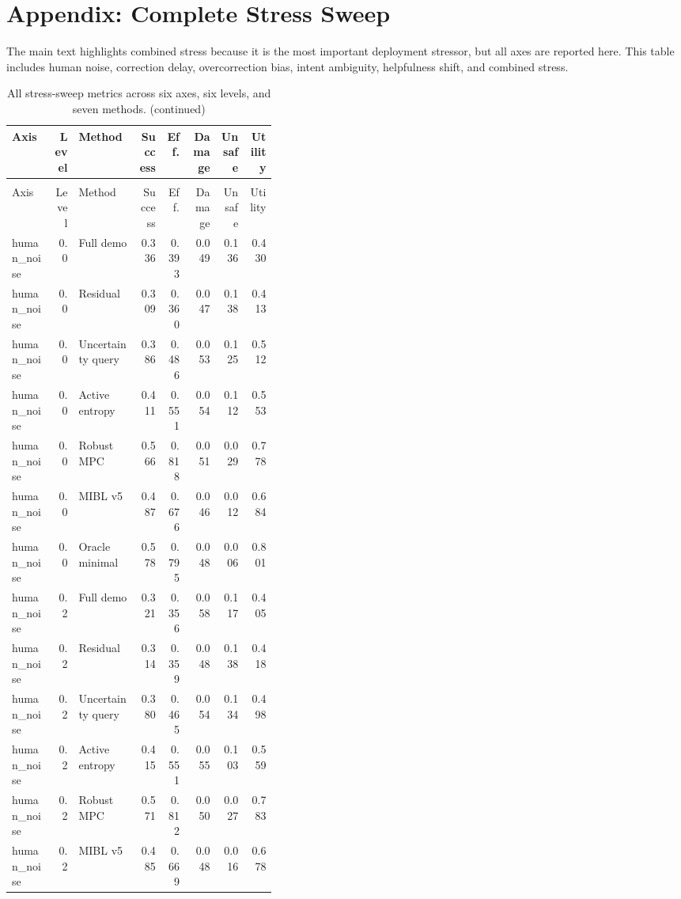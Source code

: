 \documentclass{article}
\begin{document}
\section{Appendix: Complete Stress Sweep}
The main text highlights combined stress because it is the most important deployment stressor, but all axes are reported here. This table includes human noise, correction delay, overcorrection bias, intent ambiguity, helpfulness shift, and combined stress.
\begin{center}
\tiny
\begin{longtable}{p{0.16\linewidth}rp{0.23\linewidth}rrrrr}
\caption{All stress-sweep metrics across six axes, six levels, and seven methods.}\label{tab:full-stress}\\
\toprule
Axis & Level & Method & Success & Eff. & Damage & Unsafe & Utility\\
\midrule
\endfirsthead
\caption[]{All stress-sweep metrics across six axes, six levels, and seven methods. (continued)}\\
\toprule
Axis & Level & Method & Success & Eff. & Damage & Unsafe & Utility\\
\midrule
\endhead
human\_noise & 0.0 & Full demo & 0.336 & 0.393 & 0.049 & 0.136 & 0.430\\
human\_noise & 0.0 & Residual & 0.309 & 0.360 & 0.047 & 0.138 & 0.413\\
human\_noise & 0.0 & Uncertainty query & 0.386 & 0.486 & 0.053 & 0.125 & 0.512\\
human\_noise & 0.0 & Active entropy & 0.411 & 0.551 & 0.054 & 0.112 & 0.553\\
human\_noise & 0.0 & Robust MPC & 0.566 & 0.818 & 0.051 & 0.029 & 0.778\\
human\_noise & 0.0 & MIBL v5 & 0.487 & 0.676 & 0.046 & 0.012 & 0.684\\
human\_noise & 0.0 & Oracle minimal & 0.578 & 0.795 & 0.048 & 0.006 & 0.801\\
human\_noise & 0.2 & Full demo & 0.321 & 0.356 & 0.058 & 0.117 & 0.405\\
human\_noise & 0.2 & Residual & 0.314 & 0.359 & 0.048 & 0.138 & 0.418\\
human\_noise & 0.2 & Uncertainty query & 0.380 & 0.465 & 0.054 & 0.134 & 0.498\\
human\_noise & 0.2 & Active entropy & 0.415 & 0.551 & 0.055 & 0.103 & 0.559\\
human\_noise & 0.2 & Robust MPC & 0.571 & 0.812 & 0.050 & 0.027 & 0.783\\
human\_noise & 0.2 & MIBL v5 & 0.485 & 0.669 & 0.048 & 0.016 & 0.678\\

\end{longtable}
\end{center}
\end{document}
